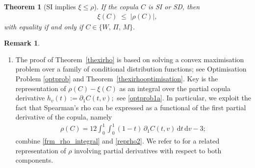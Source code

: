 \documentclass{article}
\theoremstyle{plain}
\newtheorem{theorem}{Theorem}
\theoremstyle{definition}
\newtheorem{remark}{Remark}
\newcommand{\de}{\mathrm{\,d}}
\begin{document}
\begin{theorem}[SI implies $\xi\le \rho$]\label{thm:rho_ge_xi}
If the copula $C$ is SI or SD, then
\begin{align}\label{eqthm:rho_ge_xi}
    \xi(C)\;\le\;|\rho(C)|,
\end{align}
with equality if and only if $C\in\{W,\,\Pi,\,M\}.$
\end{theorem}

\begin{remark}\label{remmain}
\leavevmode
\begin{enumerate}[label=(\alph*)]
    \item The proof of Theorem~\ref{thexirho} is based on solving a convex maximisation problem over a family of conditional distribution functions; see Optimisation Problem \ref{optprob} and Theorem~\ref{thexirhooptimisation}. Key is the representation of \(\rho(C)-\xi(C)\) as an integral over the partial copula derivative \(h_v(t) := \partial_1 C(t,v);\) see \eqref{optprob1a}. In particular, we exploit the fact that Spearman’s rho can be expressed as a functional of the first partial derivative of the copula, namely
    \begin{align}\label{reprhocopder}
        \rho(C) = 12 \int_0^1 \int_0^1 (1-t) \, \partial_1 C(t,v) \de t \de v - 3;
    \end{align}
    combine \eqref{frm_rho_integral} and \eqref{reprho2}. We refer to \cite{Fredricks-Nelsen-2007} for a related representation of \(\rho\) involving partial derivatives with respect to both components.
    

\end{enumerate}
\end{remark}
\end{document}

